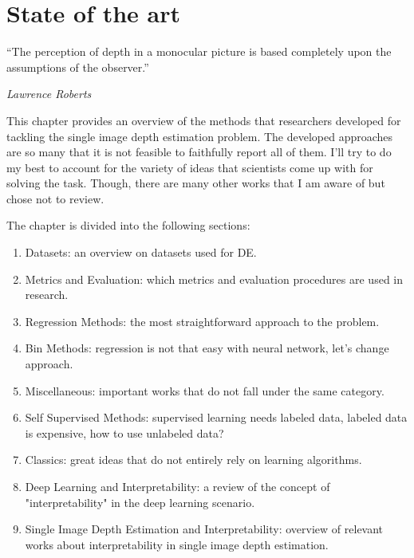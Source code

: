 \chapter{State of the art}
\label{ch:sota}

\epigraph{\enquote{The perception of depth in a monocular picture is based completely upon the assumptions of the observer.}}{\emph{Lawrence Roberts}}

This chapter provides an overview of the methods that researchers developed for tackling the single image depth estimation problem.
The developed approaches are so many that it is not feasible to faithfully report all of them.
I'll try to do my best to account for the variety of ideas that scientists come up with for solving the task.
Though, there are many other works that I am aware of but chose not to review.

The chapter is divided into the following sections:
\begin{enumerate}
    \item{Datasets: an overview on datasets used for DE.}
    \item{Metrics and Evaluation: which metrics and evaluation procedures are used in research.}
    \item{Regression Methods: the most straightforward approach to the problem.}
    \item{Bin Methods: regression is not that easy with neural network, let's change approach.}
    \item{Miscellaneous: important works that do not fall under the same category.}
    \item{Self Supervised Methods: supervised learning needs labeled data, labeled data is expensive, how to use unlabeled data?}
    \item{Classics: great ideas that do not entirely rely on learning algorithms.}
    \item{Deep Learning and Interpretability: a review of the concept of "interpretability" in the deep learning scenario.}
    \item{Single Image Depth Estimation and Interpretability: overview of relevant works about interpretability in single image depth estimation.}
\end{enumerate}









